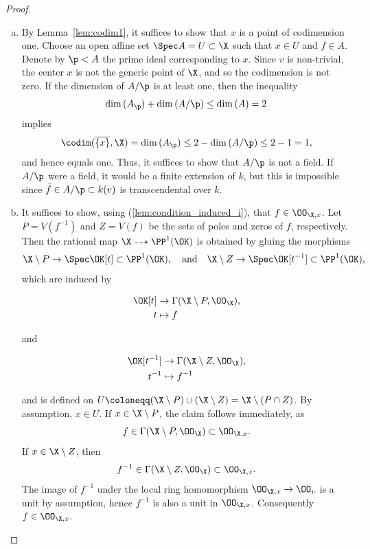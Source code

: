 \begin{proof}
    \begin{enumerate}[(a)]
    \item By Lemma~\ref{lem:codim1}, it suffices to show that $x$ is a point of codimension one.
    Choose an open affine set $\Spec A = U \subset \X$ such that $x \in U$ and $f \in A$.
    Denote by $\p < A$ the prime ideal corresponding to $x$.
    Since $v$ is non-trivial, the center $x$ is not the generic point of $\X$, and so the codimension is not zero.
    If the dimension of $A/\p$ is at least one, then the inequality
    \[
        \dim{}(A_\p) + \dim{}(A/\p) \leq \dim{}(A) = 2
    \]
    implies
    \[
        \codim(\overline{\{x\}}, \X) = \dim{}(A_\p) \leq 2 - \dim{}(A/\p) \leq 2 - 1 = 1,
    \]
    and hence equals one.
    Thus, it suffices to show that $A/\p$ is not a field.
    If $A/\p$ were a field, it would be a finite extension
    of $k$, but this is impossible since $\bar{f} \in A/\p \subset k(v)$ is transcendental over $k$.
    \item It suffices to show, using (\ref{lem:condition_induced_i}), that $f \in \OO_{\X, x}$.
    Let $P = V(f^{-1})$ and $Z = V(f)$ be the sets of poles and zeros of $f$, respectively.
    Then the rational map $\X \dashrightarrow \PP^1(\OK )$ is obtained by gluing the morphisms
    \[
        \X \setminus P  \to \Spec \OK [t] \subset \PP^1(\OK ), \quad \textrm{and} \quad
        \X \setminus Z \to \Spec \OK [t^{-1}] \subset \PP^1(\OK ),
    \]
    which are induced by
    \begin{center}
        \begin{minipage}{0.25\textwidth}
            \begin{align*}
                \OK [t] &\to \Gamma(\X \setminus P, \OO_{\X}), \\
                t &\mapsto f
            \end{align*}
        \end{minipage}
        \quad and \quad
        \begin{minipage}{0.25\textwidth}
            \begin{align*}
                \OK [t^{-1}] &\to \Gamma(\X \setminus Z, \OO_{\X}), \\
                t^{-1} &\mapsto f^{-1}
            \end{align*}
        \end{minipage}
    \end{center}
    and is defined on $U \coloneqq (\X \setminus P) \cup (\X \setminus Z) = \X \setminus (P \cap Z)$.
    By assumption, $x \in U$. If $x \in \X \setminus P$, the claim follows immediately, as
    \[
        f \in \Gamma(\X \setminus P, \OO_{\X}) \subset \OO_{\X, x}.
    \]
    If $x \in \X \setminus Z$, then
    \[
        f^{-1} \in \Gamma(\X \setminus Z, \OO_{\X}) \subset \OO_{\X, x}.
    \]
    The image of $f^{-1}$ under the local ring homomorphism $\OO_{\X, x} \to \OO_v$ is a unit by assumption,
    hence $f^{-1}$ is also a unit in $\OO_{\X, x}$.
    Consequently $f \in \OO_{\X, x}$.
    \end{enumerate}
\end{proof}

